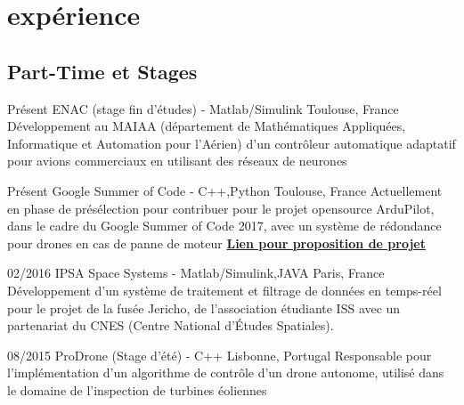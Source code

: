 \documentclass[a4paper]{friggeri-cv} %
\begin{document}

\section{expérience}


\subsection{Part-Time et Stages}

\begin{entrylist}
\entry
{Présent}
{ENAC (stage fin d'études) - Matlab/Simulink}
{Toulouse, France}
{Développement au MAIAA (département de Mathématiques Appliquées, Informatique et Automation pour l'Aérien) d'un contrôleur automatique adaptatif pour avions commerciaux en utilisant des réseaux de neurones}

\entry
{Présent}
{Google Summer of Code - C++,Python}
{Toulouse, France}
{Actuellement en phase de présélection pour contribuer pour le projet opensource ArduPilot, dans le cadre du Google Summer of Code 2017, avec un système de rédondance pour drones en cas de panne de moteur \href{https://docs.google.com/document/d/16HyPdOwpOjrw7oF_kXttN3LBA1qMHv-AwRugvF1ypeQ/edit?usp=sharing}{\textbf{Lien pour proposition de projet}}}


\entry
{02/2016}
{IPSA Space Systems - Matlab/Simulink,JAVA}
{Paris, France}
{Développement d'un système de traitement et filtrage de données en temps-réel pour le projet de la fusée Jericho, de l'association étudiante ISS avec un partenariat du CNES (Centre National d'Études Spatiales).}


\entry
{08/2015}
{ProDrone (Stage d'été) - C++}
{Lisbonne, Portugal}
{Responsable pour l'implémentation d'un algorithme de contrôle d'un drone autonome, utilisé dans le domaine de l'inspection de turbines éoliennes}



\end{entrylist}

\end{document}
